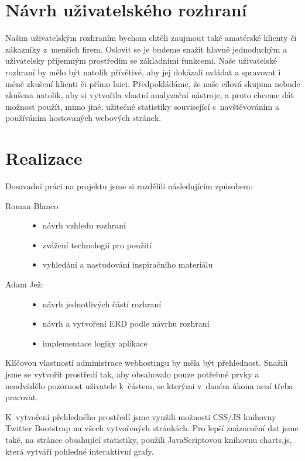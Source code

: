 \documentclass[11pt,a4paper]{article}
\begin{document}
  \section{Návrh uživatelského rozhraní}

    Našim uživatelským rozhraním bychom chtěli zaujmout také amatérské
    klienty či zákazníky z~menších firem. Oslovit se je budeme snažit
    hlavně jednoduchým a uživatelsky příjemným prostředím se základními funkcemi.
    Naše uživatelské rozhraní by mělo být natolik přívětivé, aby
    jej dokázali ovládat a spravovat i méně zkušení klienti či přímo laici.
    Předpokládáme, že naše cílová skupina nebude zkušena natolik, aby si
    vytvořila vlastní analyzační nástroje, a proto chceme dát možnost použít, mimo jiné,
    užitečné statistiky související s~navštěvováním a používáním hostovaných
    webových stránek.

  \section{Realizace}

    Dosavadní práci na projektu jsme si rozdělili následujícím způsobem:
    \begin{description}
      \item[Roman Blanco] \hfill
        \begin{itemize}
          \item návrh vzhledu rozhraní
          \item zvážení technologií pro použití
          \item vyhledání a nastudování inspiračního materiálu
        \end{itemize}
      \item[Adam Jež:] \hfill
        \begin{itemize}
          \item návrh jednotlivých částí rozhraní
          \item návrh a vytvoření ERD podle návrhu rozhraní
          \item implementace logiky aplikace
        \end{itemize}
    \end{description}

    Klíčovou vlastností administrace webhostingu by měla být přehlednost. Snažili jsme se
    vytvořit prostředí tak, aby obsahovalo pouze potřebné prvky a neodvádělo
    pozornost uživatele k~částem, se kterými v~daném úkonu není třeba pracovat.

    K~vytvoření přehledného prostředí jsme využili možnosti CSS/JS knihovny
    Twitter Bootstrap na všech vytvořených stránkách.
    Pro lepší znázornění dat jsme také, na stránce obsahující statistiky, použili
    JavaScriptovou knihovnu charts.js, která vytváří pohledné interaktivní grafy.
\end{document}
